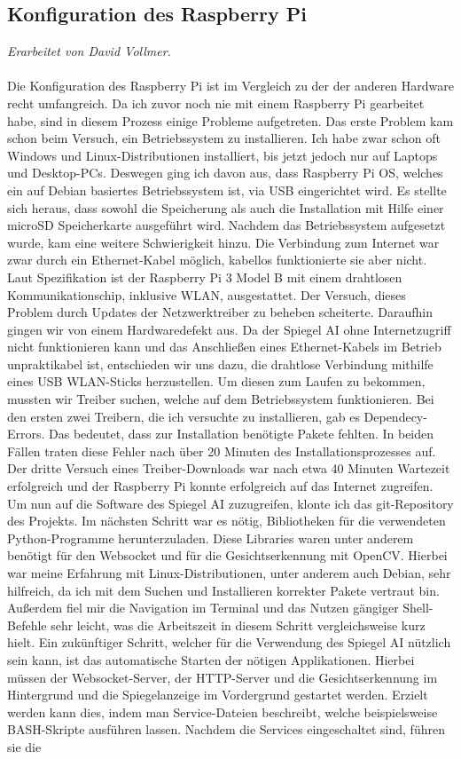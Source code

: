 \subsection{Konfiguration des Raspberry Pi}
\textit{Erarbeitet von David Vollmer.} \\ \\
Die Konfiguration des Raspberry Pi ist im Vergleich zu der der anderen Hardware recht umfangreich. Da ich zuvor noch nie mit einem Raspberry Pi gearbeitet habe, sind in diesem Prozess einige Probleme aufgetreten. Das erste Problem kam schon beim Versuch, ein Betriebssystem zu installieren. Ich habe zwar schon oft Windows und Linux-Distributionen installiert, bis jetzt jedoch nur auf Laptops und Desktop-PCs. Deswegen ging ich davon aus, dass Raspberry Pi OS, welches ein auf Debian basiertes Betriebssystem ist, via USB eingerichtet wird.\cite{raspi_os} Es stellte sich heraus, dass sowohl die Speicherung als auch die Installation mit Hilfe einer microSD Speicherkarte ausgeführt wird. Nachdem das Betriebssystem aufgesetzt wurde, kam eine weitere Schwierigkeit hinzu. Die Verbindung zum Internet war zwar durch ein Ethernet-Kabel möglich, kabellos funktionierte sie aber nicht. Laut Spezifikation ist der Raspberry Pi 3 Model B mit einem drahtlosen Kommunikationschip, inklusive WLAN, ausgestattet.\cite{raspberry_pi} Der Versuch, dieses Problem durch Updates der Netzwerktreiber zu beheben scheiterte. Daraufhin gingen wir von einem Hardwaredefekt aus. Da der Spiegel AI ohne Internetzugriff nicht funktionieren kann und das Anschließen eines Ethernet-Kabels im Betrieb unpraktikabel ist, entschieden wir uns dazu, die drahtlose Verbindung mithilfe eines USB WLAN-Sticks herzustellen. Um diesen zum Laufen zu bekommen, mussten wir Treiber suchen, welche auf dem Betriebssystem funktionieren. Bei den ersten zwei Treibern, die ich versuchte zu installieren, gab es Dependecy-Errors. Das bedeutet, dass zur Installation benötigte Pakete fehlten. In beiden Fällen traten diese Fehler nach über 20 Minuten des Installationsprozesses auf. Der dritte Versuch eines Treiber-Downloads war nach etwa 40 Minuten Wartezeit erfolgreich und der Raspberry Pi konnte erfolgreich auf das Internet zugreifen. Um nun auf die Software des Spiegel AI zuzugreifen, klonte ich das git-Repository des Projekts. Im nächsten Schritt war es nötig, Bibliotheken für die verwendeten Python-Programme herunterzuladen. Diese Libraries waren unter anderem benötigt für den Websocket und für die Gesichtserkennung mit OpenCV. Hierbei war meine Erfahrung mit Linux-Distributionen, unter anderem auch Debian, sehr hilfreich, da ich mit dem Suchen und Installieren korrekter Pakete vertraut bin. Außerdem fiel mir die Navigation im Terminal und das Nutzen gängiger Shell-Befehle sehr leicht, was die Arbeitszeit in diesem Schritt vergleichsweise kurz hielt. Ein zukünftiger Schritt, welcher für die Verwendung des Spiegel AI nützlich sein kann, ist das automatische Starten der nötigen Applikationen. Hierbei müssen der Websocket-Server, der HTTP-Server und die Gesichtserkennung im Hintergrund und die Spiegelanzeige im Vordergrund gestartet werden. Erzielt werden kann dies, indem man Service-Dateien beschreibt, welche beispielsweise BASH-Skripte ausführen lassen. Nachdem die Services eingeschaltet sind, führen sie die 